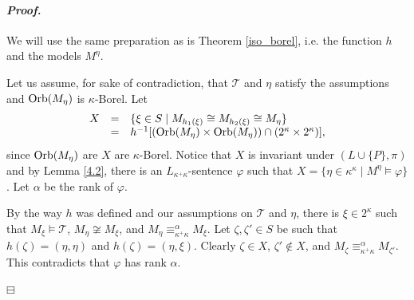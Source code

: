 \documentclass[12pt,a4paper]{amsart}
\newtheorem{cor}[thm]{Corollary}
\newtheorem{fact}[thm]{Fact}
\theoremstyle{definition}
\theoremstyle{remark}
\renewcommand{\mid}{\mathrel{|}\allowbreak}
\newenvironment{cproof}{\paragraph{\emph{Proof.\,}}}{\hfill{$\boxminus$}\par\vspace{2mm}}
\def\Orb{\mbox{\rm Orb}}
\begin{document}
\begin{cproof}
We will use the same preparation as is Theorem \ref{iso_borel}, i.e. the function $h$ and the models $M^\eta$.

Let us assume, for sake of contradiction, that $\mathcal{T}$ and $\eta$ satisfy the assumptions and $\Orb(M_{\eta})$ is $\kappa$-Borel. Let $$\begin{array}{lcl}
X&=&\{\xi\in S\mid M_{h_1(\xi)}\cong M_{h_2(\xi)}\cong M_{\eta}\}\\
&=&h^{-1}[(\Orb(M_{\eta})\times \Orb(M_{\eta}))\cap (2^\kappa\times 2^\kappa)],\end{array}$$ since $\Orb(M_{\eta})$ are $X$ are $\kappa$-Borel. Notice that $X$ is invariant under $(L\cup\{P\},\pi)$ and by Lemma \ref{4.2}, there is an $L_{\kappa^+\kappa}$-sentence $\varphi$ such that $X=\{\eta\in \kappa^\kappa\mid M^\eta\models \varphi\}$. Let $\alpha$ be the rank of $\varphi$.

By the way $h$ was defined and our assumptions on $\mathcal{T}$ and $\eta$, there is $\xi\in 2^\kappa$ such that $M_{\xi}\models \mathcal{T}$, $M_{\eta}\not\cong M_{\xi}$, and $M_{\eta}\equiv_{\kappa^+\kappa}^\alpha M_{\xi}$.
Let $\zeta,\zeta'\in S$ be such that $h(\zeta)=(\eta,\eta)$ and $h(\zeta)=(\eta,\xi)$. Clearly $\zeta\in X$, $\zeta'\notin X$, and $M_{\zeta}\equiv_{\kappa^+\kappa}^\alpha M_{\zeta'}$. This contradicts that $\varphi$ has rank $\alpha$.

\end{cproof}

\end{document}
